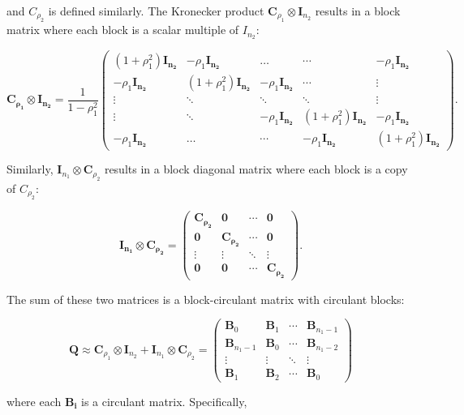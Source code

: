 \documentclass[journal=,manuscript=]{achemso}
\begin{document}
and \(C_{\rho_2}\) is defined similarly. The Kronecker product
\(\mathbf C_{\rho_1} \otimes \mathbf I_{n_2}\) results in a block matrix
where each block is a scalar multiple of \(I_{n_2}\):

\[
\mathbf{C_{\rho_1}} \otimes \mathbf{I_{n_2}} = \frac{1}{1-\rho_1^2}
\begin{pmatrix}
(1+\rho_1^2)\mathbf{I_{n_2}} & -\rho_1\mathbf{I_{n_2}} & \dots & \cdots & -\rho_1\mathbf{I_{n_2}} \\
-\rho_1\mathbf{I_{n_2}} & (1+\rho_1^2)\mathbf{I_{n_2}} & -\rho_1 \mathbf{I_{n_2}} & \cdots & \vdots  \\
\vdots & \ddots & \ddots & \ddots & \vdots \\
\vdots & \ddots & -\rho_1\mathbf{I_{n_2}} & (1+\rho_1^2)\mathbf{I_{n_2}} & -\rho_1 \mathbf{I_{n_2}}  \\
-\rho_1\mathbf{I_{n_2}} & \dots & \cdots & -\rho_1 \mathbf{I_{n_2}} & (1+\rho_1^2)\mathbf{I_{n_2}}
\end{pmatrix}.
\]

Similarly, \(\mathbf I_{n_1} \otimes \mathbf C_{\rho_2}\) results in a
block diagonal matrix where each block is a copy of \(C_{\rho_2}\):

\[
\mathbf{I_{n_1}} \otimes \mathbf{C_{\rho_2}} = 
\begin{pmatrix}
\mathbf{C_{\rho_2}} & \mathbf{0} & \cdots & \mathbf{0} \\
\mathbf{0} & \mathbf{C_{\rho_2}} & \cdots & \mathbf{0} \\
\vdots & \vdots & \ddots & \vdots \\
\mathbf{0} & \mathbf{0} & \cdots & \mathbf{C_{\rho_2}}
\end{pmatrix}.
\]

The sum of these two matrices is a block-circulant matrix with circulant
blocks:

\[
\mathbf{Q} \approx \mathbf C_{\rho_1} \otimes \mathbf I_{n_2} + \mathbf I_{n_1} \otimes \mathbf C_{\rho_2} = 
\begin{pmatrix}
\mathbf{B}_0 & \mathbf{B}_1 & \cdots & \mathbf{B}_{n_1-1} \\
\mathbf{B}_{n_1-1} & \mathbf{B}_0 & \cdots & \mathbf{B}_{n_1-2} \\
\vdots & \vdots & \ddots & \vdots \\
\mathbf{B}_1 & \mathbf{B}_2 & \cdots & \mathbf{B}_0
\end{pmatrix}
\]

where each \(\mathbf{B_i}\) is a circulant matrix. Specifically,
\end{document}
